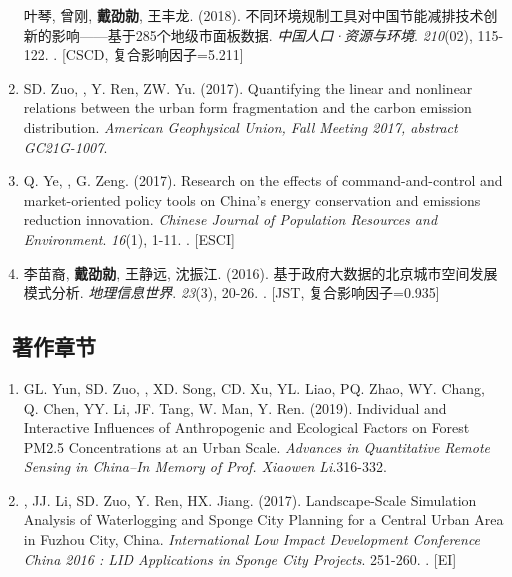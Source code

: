 \begin{enumerate}
    叶琴, 曾刚, \textbf{戴劭勍}, 王丰龙. (2018).
	不同环境规制工具对中国节能减排技术创新的影响——基于285个地级市面板数据.
    \textit{中国人口·资源与环境}. \textit{210}(02), 115-122.
    . [CSCD, 复合影响因子=5.211]
\item
    SD. Zuo, \Shaoqing, Y. Ren, ZW. Yu. (2017).
    Quantifying the linear and nonlinear relations between the urban form fragmentation and the carbon emission distribution.
    \textit{American Geophysical Union, Fall Meeting 2017, abstract GC21G-1007}.
\item
    Q. Ye, \Shaoqing, G. Zeng. (2017).
	Research on the effects of command-and-control and market-oriented policy tools on China’s energy conservation and emissions reduction innovation.
    \textit{Chinese Journal of Population Resources and Environment}. \textit{16}(1), 1-11.
    . [ESCI]
\item
   李苗裔, \textbf{戴劭勍}, 王静远, 沈振江. (2016).
	基于政府大数据的北京城市空间发展模式分析.
    \textit{地理信息世界}. \textit{23}(3), 20-26.
    . [JST, 复合影响因子=0.935]
\end{enumerate}

\subsection*{\texorpdfstring{\faBook\ 著作章节}{著作章节}}
\begin{enumerate}
\item
    GL. Yun, SD. Zuo, \Shaoqing, XD. Song, CD. Xu, YL. Liao, PQ. Zhao, WY. Chang, Q. Chen, YY. Li, JF. Tang, W. Man, Y. Ren. (2019).
	Individual and Interactive Influences of Anthropogenic and Ecological Factors on Forest PM2.5 Concentrations at an Urban Scale.
    \textit{Advances in Quantitative Remote Sensing in China–In Memory of Prof. Xiaowen Li}.316-332.
\item
    \Shaoqing, JJ. Li, SD. Zuo, Y. Ren, HX. Jiang. (2017).
	Landscape-Scale Simulation Analysis of Waterlogging and Sponge City Planning for a Central Urban Area in Fuzhou City, China.
    \textit{International Low Impact Development Conference China 2016 : LID Applications in Sponge City Projects}. 251-260.
    . [EI]
\end{enumerate}


